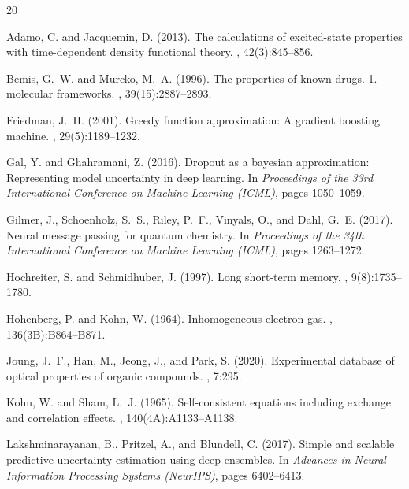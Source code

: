 \documentclass[12pt]{article}
\begin{document}
\begin{thebibliography}{20}

Adamo, C. and Jacquemin, D. (2013).
\newblock The calculations of excited-state properties with time-dependent density functional theory.
, 42(3):845--856.

Bemis, G.~W. and Murcko, M.~A. (1996).
\newblock The properties of known drugs. 1. molecular frameworks.
, 39(15):2887--2893.

Friedman, J.~H. (2001).
\newblock Greedy function approximation: A gradient boosting machine.
, 29(5):1189--1232.

Gal, Y. and Ghahramani, Z. (2016).
\newblock Dropout as a bayesian approximation: Representing model uncertainty in deep learning.
\newblock In {\em Proceedings of the 33rd International Conference on Machine Learning (ICML)}, pages 1050--1059.

Gilmer, J., Schoenholz, S.~S., Riley, P.~F., Vinyals, O., and Dahl, G.~E. (2017).
\newblock Neural message passing for quantum chemistry.
\newblock In {\em Proceedings of the 34th International Conference on Machine Learning (ICML)}, pages 1263--1272.

Hochreiter, S. and Schmidhuber, J. (1997).
\newblock Long short-term memory.
, 9(8):1735--1780.

Hohenberg, P. and Kohn, W. (1964).
\newblock Inhomogeneous electron gas.
, 136(3B):B864--B871.

Joung, J.~F., Han, M., Jeong, J., and Park, S. (2020).
\newblock Experimental database of optical properties of organic compounds.
, 7:295.

Kohn, W. and Sham, L.~J. (1965).
\newblock Self-consistent equations including exchange and correlation effects.
, 140(4A):A1133--A1138.

Lakshminarayanan, B., Pritzel, A., and Blundell, C. (2017).
\newblock Simple and scalable predictive uncertainty estimation using deep ensembles.
\newblock In {\em Advances in Neural Information Processing Systems (NeurIPS)}, pages 6402--6413.


\end{thebibliography}
\end{document}
